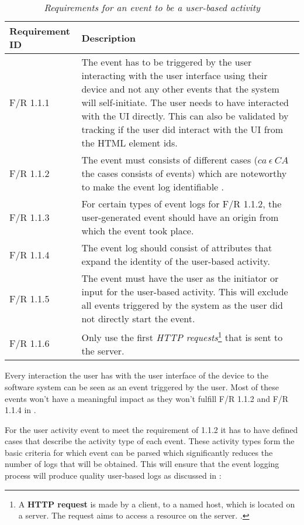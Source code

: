 \begin{table}[!htb]
	\centering
	\caption[Requirements for an event to be a user-based activity]
	{\textit{Requirements for an event to be a user-based activity}}
	\label{tbl:ch2_requirementsForUserActivtyEvent}
	\begin{tabularx}{\textwidth}{|l|X|}
		\hline \textbf{Requirement ID} & \textbf{Description}\\
		\hline F/R 1.1.1 & The event has to be triggered by the user interacting with the user interface using their device and not any other events that the system will self-initiate. The user needs to have interacted with the UI directly. This can also be validated by tracking if the user did interact with the UI from the HTML element ids. \\
		\hline F/R 1.1.2 & The event must consists of different cases ($ca~ \epsilon~CA$ the cases consists of events) which are noteworthy to make the event log identifiable \cite{Slaninova2014}. \\
		\hline F/R 1.1.3 & For certain types of event logs for F/R 1.1.2, the user-generated event should have an origin from which the event took place. \\
		\hline F/R 1.1.4 & The event log should consist of attributes that expand the identity of the user-based activity. \\
		\hline F/R 1.1.5 & The event must have the user as the initiator or input for the user-based activity. This will exclude all events triggered by the system as the user did not directly start the event. \\
		\hline F/R 1.1.6 & Only use the first \textit{HTTP requests}\footnote{A \textbf{HTTP request} is made by a client, to a named host, which is located on a server. The request aims to access a resource on the server. \cite{IBM2021}.} that is sent to the server. \\ 
		\hline
	\end{tabularx}
\end{table}

Every interaction the user has with the user interface of the device to the software system can be seen as an event triggered by the user. Most of these events won't have a meaningful impact as they won't fulfill F/R 1.1.2 and F/R 1.1.4 in .\par For the user activity event to meet the requirement of 1.1.2 it has to have defined cases that describe the activity type of each event. These activity types form the basic criteria for which event can be parsed which significantly reduces the number of logs that will be obtained. This will ensure that the event logging process will produce quality user-based logs as discussed in :

